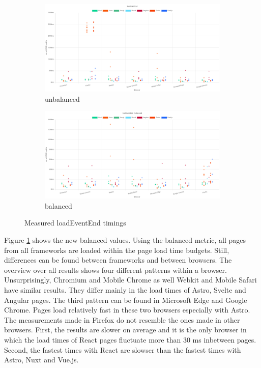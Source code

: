 \documentclass[a4paper, 10pt]{article}
\begin{document}
\begin{figure}
  \centering
  \begin{subfigure}{\linewidth}
    \includegraphics[width=\linewidth, keepaspectratio]{img/playwright-results/loadEventEnd/total.png}
    \caption{unbalanced}\label{subfig:Playwright:loadEventEnd:unbalanced}
  \end{subfigure}
  \begin{subfigure}{\linewidth}
    \includegraphics[width=\linewidth, keepaspectratio]{img/playwright-results/loadEventEnd_balanced/total.png}
    \caption{balanced}\label{subfig:Playwright:loadEventEnd:balanced}
  \end{subfigure}
  \caption{Measured loadEventEnd timings}
  \label{fig:Playwright:loadEventEnd}
\end{figure}

Figure \ref{subfig:Playwright:loadEventEnd:unbalanced} shows the new balanced values.
Using the balanced metric, all pages from all frameworks are loaded within the page load time budgets.
Still, differences can be found between frameworks and between browsers.
The overview over all results shows four different patterns within a browser.
Unsurprisingly, Chromium and Mobile Chrome as well Webkit and Mobile Safari have similar results.
They differ mainly in the load times of Astro, Svelte and Angular pages.
The third pattern can be found in Microsoft Edge and Google Chrome.
Pages load relatively fast in these two browsers especially with Astro.
The measurements made in Firefox do not resemble the ones made in other browsers.
First, the results are slower on average and it is the only browser in which the load times of React pages fluctuate more than 30 ms inbetween pages.
Second, the fastest times with React are slowser than the fastest times with Astro, Nuxt and Vue.js.
\end{document}
